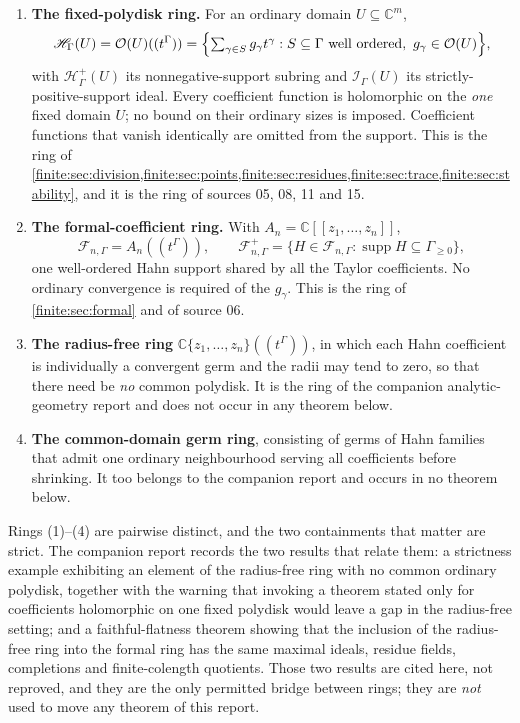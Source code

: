 \documentclass[11pt,letterpaper]{article}
\theoremstyle{definition}
\theoremstyle{remark}
\newcommand{\C}{\mathbb C}
\newcommand{\OO}{\mathcal O}
\newcommand{\HH}{\mathscr H}
\newcommand{\Hp}{\mathscr H^{+}}
\newcommand{\Ip}{\mathscr I}
\newcommand{\Af}{\mathscr F}
\DeclareMathOperator{\supp}{supp}
\numberwithin{equation}{section}
\begin{document}
\begin{enumerate}
\item \textbf{The fixed-polydisk ring.} For an ordinary domain $U\subseteq\C^m$,
\[
 \HH_\Gamma(U)=\OO(U)((t^\Gamma))
 =\Bigl\{\textstyle\sum_{\gamma\in S}g_\gamma t^\gamma:
 S\subseteq\Gamma\ \text{well ordered},\ g_\gamma\in\OO(U)\Bigr\},
\]
with $\Hp_\Gamma(U)$ its nonnegative-support subring and $\Ip_\Gamma(U)$ its strictly-positive-support ideal. Every coefficient function is holomorphic on the \emph{one} fixed domain $U$; no bound on their ordinary sizes is imposed. Coefficient functions that vanish identically are omitted from the support. This is the ring of \cref{finite:sec:division,finite:sec:points,finite:sec:residues,finite:sec:trace,finite:sec:stability}, and it is the ring of sources 05, 08, 11 and 15.
\item \textbf{The formal-coefficient ring.} With $A_n=\C[[z_1,\ldots,z_n]]$,
\[
 \Af_{n,\Gamma}=A_n((t^\Gamma)),
 \qquad
 \Af^+_{n,\Gamma}=\{H\in\Af_{n,\Gamma}:\supp H\subseteq\Gamma_{\geq0}\},
\]
one well-ordered Hahn support shared by all the Taylor coefficients. No ordinary convergence is required of the $g_\gamma$. This is the ring of \cref{finite:sec:formal} and of source 06.
\item \textbf{The radius-free ring} $\C\{z_1,\ldots,z_n\}((t^\Gamma))$, in which each Hahn coefficient is individually a convergent germ and the radii may tend to zero, so that there need be \emph{no} common polydisk. It is the ring of the companion analytic-geometry report and does not occur in any theorem below.
\item \textbf{The common-domain germ ring}, consisting of germs of Hahn families that admit one ordinary neighbourhood serving all coefficients before shrinking. It too belongs to the companion report and occurs in no theorem below.
\end{enumerate}

Rings (1)--(4) are pairwise distinct, and the two containments that matter are strict. The companion report records the two results that relate them: a strictness example exhibiting an element of the radius-free ring with no common ordinary polydisk, together with the warning that invoking a theorem stated only for coefficients holomorphic on one fixed polydisk would leave a gap in the radius-free setting; and a faithful-flatness theorem showing that the inclusion of the radius-free ring into the formal ring has the same maximal ideals, residue fields, completions and finite-colength quotients. Those two results are cited here, not reproved, and they are the only permitted bridge between rings; they are \emph{not} used to move any theorem of this report.
\end{document}
